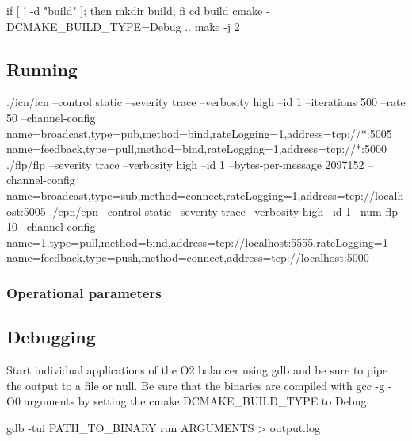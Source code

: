 \begin{DoxyCode}
if [ ! -d "build" ]; then mkdir build; fi
cd build
cmake -DCMAKE\_BUILD\_TYPE=Debug ..
make -j 2
\end{DoxyCode}


\subsection*{Running}


\begin{DoxyCode}
./icn/icn --control static --severity trace --verbosity high --id 1 --iterations 500 --rate 50
       --channel-config name=broadcast,type=pub,method=bind,rateLogging=1,address=tcp://*:5005
       name=feedback,type=pull,method=bind,rateLogging=1,address=tcp://*:5000
./flp/flp --severity trace --verbosity high --id 1 --bytes-per-message 2097152 --channel-config
       name=broadcast,type=sub,method=connect,rateLogging=1,address=tcp://localhost:5005
./epn/epn --control static --severity trace --verbosity high --id 1 --num-flp 10 --channel-config
       name=1,type=pull,method=bind,address=tcp://localhost:5555,rateLogging=1
       name=feedback,type=push,method=connect,address=tcp://localhost:5000
\end{DoxyCode}


\subsubsection*{Operational parameters}

\subsection*{Debugging}

Start individual applications of the O2 balancer using gdb and be sure to pipe the output to a file or null. Be sure that the binaries are compiled with gcc {\ttfamily -\/g -\/\+O0} arguments by setting the cmake {\ttfamily D\+C\+M\+A\+K\+E\+\_\+\+B\+U\+I\+L\+D\+\_\+\+T\+Y\+PE} to {\ttfamily Debug}.


\begin{DoxyCode}
gdb -tui PATH\_TO\_BINARY
run ARGUMENTS > output.log
\end{DoxyCode}
 